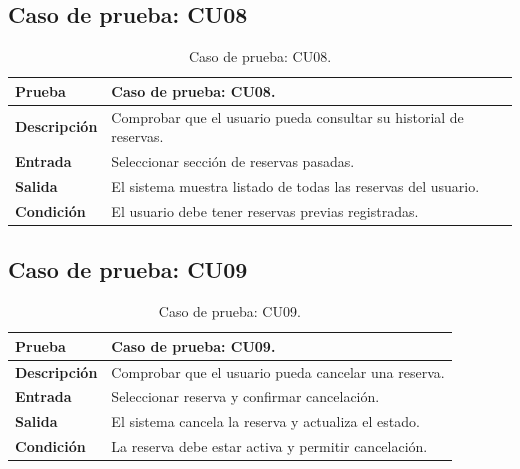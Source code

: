 
\subsection{Caso de prueba: CU08}

\begin{table}[ht]
\centering
\renewcommand{\arraystretch}{1.3}
\begin{tabular}{|p{3cm}|p{12cm}|}
\hline
\rowcolor[RGB]{191,191,191}
\textbf{Prueba} & Caso de prueba: CU08. \\
\hline
\textbf{Descripción} \cellcolor[RGB]{217,217,217} & Comprobar que el usuario pueda consultar su historial de reservas. \\
\hline
\textbf{Entrada} \cellcolor[RGB]{217,217,217} & Seleccionar sección de reservas pasadas. \\
\hline
\textbf{Salida} \cellcolor[RGB]{217,217,217} & El sistema muestra listado de todas las reservas del usuario. \\
\hline
\textbf{Condición} \cellcolor[RGB]{217,217,217} & El usuario debe tener reservas previas registradas. \\
\hline
\end{tabular}
\caption{Caso de prueba: CU08.}
\label{tab:cu08_black_test}
\end{table}


\subsection{Caso de prueba: CU09}

\begin{table}[ht]
\centering
\renewcommand{\arraystretch}{1.3}
\begin{tabular}{|p{3cm}|p{12cm}|}
\hline
\rowcolor[RGB]{191,191,191}
\textbf{Prueba} & Caso de prueba: CU09. \\
\hline
\textbf{Descripción} \cellcolor[RGB]{217,217,217} & Comprobar que el usuario pueda cancelar una reserva. \\
\hline
\textbf{Entrada} \cellcolor[RGB]{217,217,217} & Seleccionar reserva y confirmar cancelación. \\
\hline
\textbf{Salida} \cellcolor[RGB]{217,217,217} & El sistema cancela la reserva y actualiza el estado. \\
\hline
\textbf{Condición} \cellcolor[RGB]{217,217,217} & La reserva debe estar activa y permitir cancelación. \\
\hline
\end{tabular}
\caption{Caso de prueba: CU09.}
\label{tab:cu09_black_test}
\end{table}

